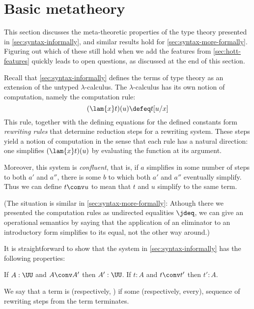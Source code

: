 \section{Basic metatheory}
%

This section discusses the meta-theoretic properties of the type theory presented in 
\autoref{sec:syntax-informally}, and similar results hold for \autoref{sec:syntax-more-formally}. Figuring out which of these still hold when we add the features from \autoref{sec:hott-features} quickly leads to open questions, as discussed at the end of this section.

Recall that \autoref{sec:syntax-informally} defines the terms of type theory as
an extension of the untyped $\lambda$-calculus. The $\lambda$-calculus 
has its own notion of computation, namely the computation rule: 
\[
  (\lam{x} t)(u) \defeq t[u/x]
\]
This rule, together with the defining equations for the defined constants form
\emph{rewriting rules} that determine reduction steps for a rewriting 
system. These steps yield a notion of computation in the sense that each rule
has a natural direction: one simplifies $(\lam{x} t)(u)$ by evaluating the
function at its argument.

Moreover, this system is \emph{confluent}, that is, if $a$ simplifies in some
number of steps to both $a'$ and $a''$, there is some $b$ to which both $a'$ and
$a''$ eventually simplify. Thus we can define $t\conv u$ to mean that $t$ and
$u$ simplify to the same term.

(The situation is similar in \autoref{sec:syntax-more-formally}: Athough there
we presented the computation rules as undirected equalities $\jdeq$, we can give
an operational semantics by saying that the application of an eliminator to an
introductory form simplifies to its equal, not the other way around.)

It is straightforward to show that the system in \autoref{sec:syntax-informally}
has the following properties:

\begin{thm}\label{thm:conversion-preserves-typing}
If $A : \UU$ and $A \conv A'$ then $A' : \UU$.
If $t:A$ and $t \conv t'$ then $t':A$.
\end{thm}

We say that a term is 
%
%
%
(respectively, )
%
%
%
if some (respectively, every), sequence of rewriting steps from the term
terminates.

